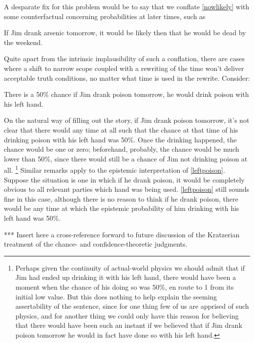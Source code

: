 \documentclass[leqno, 11pt, a5paper, openany]{article}
\begin{document}
A desparate fix for this problem would be to say that we conflate \ref{nowlikely} with some counterfactual concerning probabilities at later times, such as
\begin{prop}
\nitem \label{wouldbelikelythen}
  If Jim drank arsenic tomorrow, it would be likely then that he would be dead by the weekend.
\end{prop}
Quite apart from the intrinsic implausibility of such a conflation, there are cases where a shift to narrow scope coupled with a rewriting of the time won't deliver acceptable truth conditions, no matter what time is used in the rewrite. Consider:
\begin{prop}
\nitem \label{leftpoison}
  There is a 50\% chance if Jim drank poison tomorrow, he would drink poison with his left hand.
\end{prop}
On the natural way of filling out the story, if Jim drank poison tomorrow, it's not clear that there would any time at all such that the chance at that time of his drinking poison with his left hand was 50\%. Once the drinking happened, the chance would be one or zero; beforehand, probably, the chance would be much lower than 50\%, since there would still be a chance of Jim not drinking poison at all.%
\footnote{Perhaps given the continuity of actual-world physics we should admit that if Jim had ended up drinking it with his left hand, there would have been a moment when the chance of his doing so was 50\%, en route to 1 from its initial low value. But this does nothing to help explain the seeming assertability of the sentence, since for one thing few of us are apprised of such physics, and for another thing we could only have this reason for believing that there would have been such an instant if we believed that if Jim drank poison tomorrow he would in fact have done so with his left hand.}
Similar remarks apply to the epistemic interpretation of \ref{leftpoison}. Suppose the situation is one in which if he drank poison, it would be completely obvious to all relevant parties which hand was being used. \ref{leftpoison} still sounds fine in this case, although there is no reason to think if he drank poison, there would be any time at which the epistemic probability of him drinking with his left hand was 50\%.

*** Insert here a cross-reference forward to future discussion of the Kratzerian treatment of the chance- and confidence-theoretic judgments.  
\end{document}

